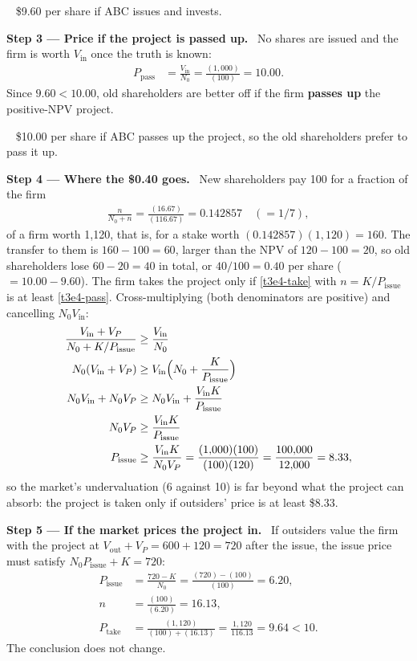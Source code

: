 \documentclass[11pt,a4paper]{article}
\newcommand{\step}[2]{\par\medskip\noindent\textbf{Step #1 --- #2.}~}
\newcommand{\answer}[1]{\par\smallskip\noindent\fbox{\textbf{Answer #1.}}~}
\begin{document}
\answer{(b)} \$9.60 per share if ABC issues and invests.

\step{3}{Price if the project is passed up} No shares are issued and the firm is worth $V_{\text{in}}$ once the truth is known:
\begin{align}
  P_{\text{pass}} &= \frac{V_{\text{in}}}{N_0} = \frac{(1{,}000)}{(100)} = 10.00. \label{t3e4-pass}
\end{align}
Since $9.60<10.00$, old shareholders are better off if the firm \textbf{passes up} the positive-NPV project.

\answer{(c)} \$10.00 per share if ABC passes up the project, so the old shareholders prefer to pass it up.

\step{4}{Where the \$0.40 goes} New shareholders pay 100 for a fraction of the firm
\begin{align}
  \frac{n}{N_0+n} = \frac{(16.67)}{(116.67)} = 0.142857 \quad(=1/7), \nonumber
\end{align}
of a firm worth 1{,}120, that is, for a stake worth $(0.142857)(1{,}120)=160$. The transfer to them is $160-100=60$, larger than the NPV of $120-100=20$, so old shareholders lose $60-20=40$ in total, or $40/100=0.40$ per share ($=10.00-9.60$). The firm takes the project only if \eqref{t3e4-take} with $n=K/P_{\text{issue}}$ is at least \eqref{t3e4-pass}. Cross-multiplying (both denominators are positive) and cancelling $N_0V_{\text{in}}$:
\begin{align}
  \frac{V_{\text{in}}+V_P}{N_0+K/P_{\text{issue}}} &\ge \frac{V_{\text{in}}}{N_0} \nonumber\\
  N_0(V_{\text{in}}+V_P) &\ge V_{\text{in}}\Bigl(N_0+\frac{K}{P_{\text{issue}}}\Bigr) \nonumber\\
  N_0V_{\text{in}}+N_0 V_P &\ge N_0V_{\text{in}}+\frac{V_{\text{in}}K}{P_{\text{issue}}} \nonumber\\
  N_0 V_P &\ge \frac{V_{\text{in}}K}{P_{\text{issue}}} \nonumber\\
  P_{\text{issue}} &\ge \frac{V_{\text{in}}K}{N_0 V_P}= \frac{(1{,}000)(100)}{(100)(120)} = \frac{100{,}000}{12{,}000} = 8.33, \label{t3e4-thr}
\end{align}
so the market's undervaluation (6 against 10) is far beyond what the project can absorb: the project is taken only if outsiders' price is at least \$8.33.

\step{5}{If the market prices the project in} If outsiders value the firm with the project at $V_{\text{out}}+V_P=600+120=720$ after the issue, the issue price must satisfy $N_0P_{\text{issue}}+K=720$:
\begin{align}
  P_{\text{issue}} &= \frac{720-K}{N_0} = \frac{(720)-(100)}{(100)} = 6.20, \nonumber\\
  n &= \frac{(100)}{(6.20)} = 16.13, \nonumber\\
  P_{\text{take}} &= \frac{(1{,}120)}{(100)+(16.13)} = \frac{1{,}120}{116.13} = 9.64 < 10. \nonumber
\end{align}
The conclusion does not change.
\end{document}
